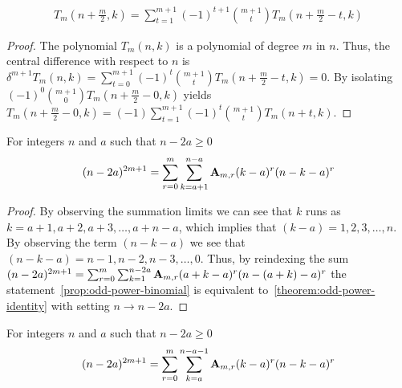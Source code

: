 \begin{proposition}
    \label{prop:Tm-recurrence-central}
    \begin{align*}
        T_{m} \left(n + \frac{m}{2}, k \right)
        = \sum_{t=1}^{m+1} (-1)^{t+1} \binom{m+1}{t} T_{m} \left( n+\frac{m}{2}-t, k \right)
    \end{align*}
    \begin{proof}
        The polynomial $T_{m} (n,k)$ is a polynomial of degree $m$ in $n$.
        Thus, the central difference with respect to $n$ is
        $\delta^{m+1} T_{m} (n, k) = \sum_{t=0}^{m+1} (-1)^{t} \binom{m+1}{t} T_{m} \left(n+\frac{m}{2} - t, k\right) = 0$.
        By isolating $(-1)^{0} \binom{m+1}{0} T_{m} \left(n+\frac{m}{2}-0, k\right)$ yields
        $T_{m} \left(n+\frac{m}{2}-0, k\right) = (-1) \sum_{t=1}^{m+1} (-1)^{t} \binom{m+1}{t} T_{m} (n+t, k)$.
    \end{proof}
\end{proposition}

\begin{proposition}
    \label{prop:odd-power-binomial}
    For integers $n$ and $a$ such that $n-2a \geq 0$
    \begin{align*}
    (n-2a)
        ^{2m+1} = \sum_{r=0}^{m} \sum_{k=a+1}^{n-a} {\mathbf{A}} \sb{m,r} (k-a)^r (n-k-a)^r
    \end{align*}
    \begin{proof}
        By observing the summation limits we can see that $k$ runs as $k=a+1,a+2,a+3,\ldots,a+n-a$, which
        implies that $(k-a)=1,2,3,\ldots, n$.
        By observing the term $(n-k-a)$ we see that $(n-k-a)=n-1,n-2,n-3,\ldots,0$.
        Thus, by reindexing the sum
        $(n-2a)^{2m+1} = \sum_{r=0}^{m} \sum_{k=1}^{n-2a} {\mathbf{A}} \sb{m,r} (a+k-a)^r (n-(a+k)-a)^r$
        the statement~\eqref{prop:odd-power-binomial} is equivalent to~\eqref{theorem:odd-power-identity}
        with setting $n \rightarrow n-2a$.
    \end{proof}
\end{proposition}

\begin{corollary}
    \label{prop:odd-power-binomial-shifted}
    For integers $n$ and $a$ such that $n-2a \geq 0$
    \begin{align*}
    (n-2a)
        ^{2m+1} = \sum_{r=0}^{m} \sum_{k=a}^{n-a-1} {\mathbf{A}} \sb{m,r} (k-a)^r (n-k-a)^r
    \end{align*}
\end{corollary}

